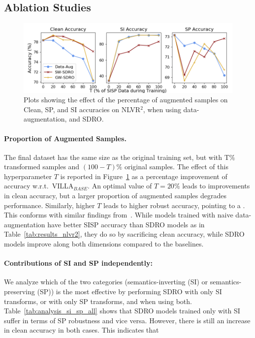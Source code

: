 \subsection{Ablation Studies}
\begin{figure}[t]
    \centering
    \includegraphics[width=\linewidth]{sdro/images/T_as_curve.png}
    \caption{
    Plots showing the effect of the percentage of augmented samples on Clean, SP, and SI accuracies on NLVR$^2$, when using data-augmentation, and SDRO.
    }
    \label{fig:NLVR2_ablation_T}
\end{figure}
\paragraph{Proportion of Augmented Samples.}
The final dataset has the same size as the original training set, but with T$\%$ transformed samples and $(100{-}T)\%$ original samples.
The effect of this hyperparameter $T$ is reported in Figure~\ref{fig:NLVR2_ablation_T} as a percentage improvement of accuracy w.r.t.\ VILLA$_{BASE}$.
An {optimal value of $T{=}20\%$ leads to improvements in clean accuracy}, but a larger proportion of augmented samples degrades performance.
Similarly, higher $T$ leads to higher robust accuracy, pointing to a .
This conforms with similar findings from~\citet{tsipras2019robustness}.
While models trained with naive data-augmentation have better SISP accuracy than SDRO models as in Table~\ref{tab:results_nlvr2}, they do so by sacrificing clean accuracy, while SDRO models improve along both dimensions compared to the baselines.

\paragraph{Contributions of SI and SP independently:}
 
We analyze which of the two categories (semantics-inverting (SI) or semantics-preserving (SP)) is the most effective by performing SDRO with only SI transforms, or with only SP transforms, and when using both.
Table~\ref{tab:analysis_si_sp_all} shows that SDRO models trained only with SI suffer in terms of SP robustness and vice versa.
However, there is still an increase in clean accuracy in both cases.
This indicates that 


